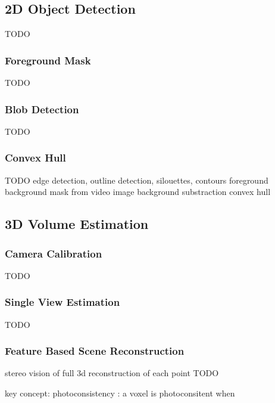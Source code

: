 \subsection{2D Object Detection}

TODO

\subsubsection{Foreground Mask}

TODO

\subsubsection{Blob Detection}

TODO

\subsubsection{Convex Hull}

TODO
edge detection, outline detection, silouettes, contours
foreground background mask from video image
background substraction
convex hull


\subsection{3D Volume Estimation}

\subsubsection{Camera Calibration}

TODO

\subsubsection{Single View Estimation}

TODO
\subsubsection{Feature Based Scene Reconstruction} 
stereo vision
of full 3d reconstruction of each point
TODO

key concept: photoconsistency : a voxel is photoconsitent when 

